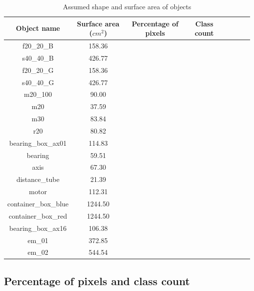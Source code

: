 		\begin{table}
			\centering
			\begin{tabular}{|c|c|c|c|c|c|c|c|}
			\hline 
  			\textbf{Object name} & \textbf{Surface area ($cm^2$)} & \textbf{Percentage of pixels} & \textbf{Class count} \\ 
			\hline
  			 f20\_20\_B & 158.36 &  & \\ 
			\hline
  			 s40\_40\_B & 426.77 &  &  \\ 
			\hline
  			 f20\_20\_G & 158.36 &  &  \\ 
			\hline
  			 s40\_40\_G & 426.77 &  &  \\ 
			\hline
  			 m20\_100 & 90.00 &  &  \\ 
			\hline
  			 m20 & 37.59 &  &  \\ 
			\hline
  			 m30 & 83.84 &  &  \\ 
			\hline
  			 r20 & 80.82 &  &  \\ 
			\hline
  			 bearing\_box\_ax01 & 114.83 &  &  \\ 
			\hline
  			 bearing & 59.51 &  &  \\ 
			\hline
  			 axis & 67.30 &  &  \\ 
			\hline
  			 distance\_tube & 21.39 &  &  \\ 
			\hline
  			 motor & 112.31 &  &  \\ 
			\hline
  			 container\_box\_blue & 1244.50 &  &  \\ 
			\hline
  			 container\_box\_red & 1244.50 &  &  \\ 
			\hline
  			 bearing\_box\_ax16 & 106.38 &  &  \\ 
			\hline
  			 em\_01 & 372.85 &  &  \\ 
			\hline
  			 em\_02 & 544.54 &  &  \\ 
			\hline
			\end{tabular}
			\caption{Assumed shape and surface area of objects} 
			\label{Table:surface}
		\end{table}
		
	\subsection{Percentage of pixels and class count}
		
